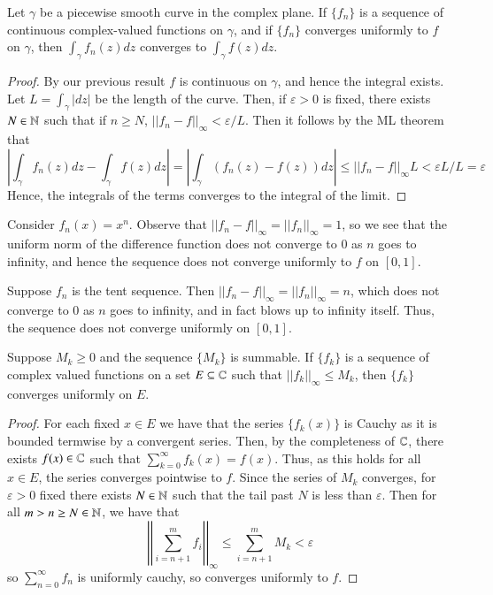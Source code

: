 \documentclass[12pt, a4paper, oneside, openright, titlepage]{book}
\begin{document}
\begin{thm}
    Let $\gamma$ be a piecewise smooth curve in the complex plane. If $\{f_n\}$ is a sequence of continuous complex-valued functions on $\gamma$, and if $\{f_n\}$ converges uniformly to $f$ on $\gamma$, then $\int_{\gamma}f_n(z)dz$ converges to $\int_{\gamma}f(z)dz$.
\end{thm}   
\begin{proof}
    By our previous result $f$ is continuous on $\gamma$, and hence the integral exists. Let $L = \int_{\gamma}|dz|$ be the length of the curve. Then, if $\varepsilon > 0$ is fixed, there exists $N \in \mathbb N$ such that if $n \geq N$, $||f_n - f||_{\infty} <\varepsilon/L$. Then it follows by the ML theorem that \begin{equation*}
        \left|\int_{\gamma}f_n(z)dz -\int_{\gamma}f(z)dz\right| = \left|\int_{\gamma}(f_n(z)-f(z))dz\right| \leq ||f_n-f||_{\infty}L < \varepsilon L/L = \varepsilon
    \end{equation*}
    Hence, the integrals of the terms converges to the integral of the limit.
\end{proof}



\begin{eg}
    Consider $f_n(x) = x^n$. Observe that $||f_n - f||_{\infty} = ||f_n||_{\infty} = 1$, so we see that the uniform norm of the difference function does not converge to $0$ as $n$ goes to infinity, and hence the sequence does not converge uniformly to $f$ on $[0,1]$.
\end{eg}

\begin{eg}
    Suppose $f_n$ is the tent sequence. Then $||f_n - f||_{\infty} = ||f_n||_{\infty} = n$, which does not converge to $0$ as $n$ goes to infinity, and in fact blows up to infinity itself. Thus, the sequence does not converge uniformly on $[0,1]$.
\end{eg}



\begin{namthm}
    Suppose $M_k \geq 0$ and the sequence $\{M_k\}$ is summable. If $\{f_k\}$ is a sequence of complex valued functions on a set $E \subseteq \mathbb C$ such that $||f_k||_{\infty} \leq M_k$, then $\{f_k\}$ converges uniformly on $E$.
\end{namthm}
\begin{proof}
    For each fixed $x \in E$ we have that the series $\{f_k(x)\}$ is Cauchy as it is bounded termwise by a convergent series. Then, by the completeness of $\mathbb C$, there exists $f(x) \in \mathbb C$ such that $\sum_{k=0}^{\infty}f_k(x) = f(x)$. Thus, as this holds for all $x \in E$, the series converges pointwise to $f$. Since the series of $M_k$ converges, for $\varepsilon > 0$ fixed there exists $N \in \mathbb N$ such that the tail past $N$ is less than $\varepsilon$. Then for all $m > n \geq N \in \mathbb N$, we have that \begin{equation*}
        \left|\left|\sum_{i=n+1}^mf_i\right|\right|_{\infty} \leq \sum_{i=n+1}^mM_k < \varepsilon
    \end{equation*}
    so $\sum_{n=0}^{\infty}f_n$ is uniformly cauchy, so converges uniformly to $f$.
\end{proof}
\end{document}
